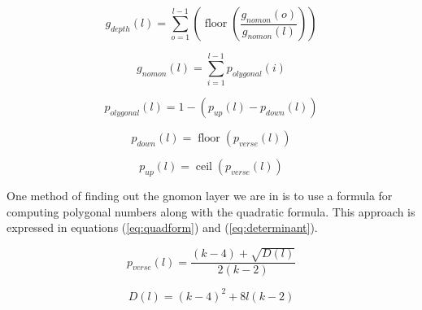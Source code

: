 \documentclass{article}
\begin{document}
\begin{equation}
    g_{depth}\left(l\right)=\sum_{o=1}^{l-1}\left(\operatorname{floor}\left(\frac{g_{nomon}\left(o\right)}{g_{nomon}\left(l\right)}\right)\right)
\end{equation}

\begin{equation}
    g_{nomon}\left(l\right)=\sum_{i=1}^{l-1}p_{olygonal}\left(i\right)
\end{equation}

\begin{equation}
    p_{olygonal}\left(l\right)=1-\left(p_{up}\left(l\right)-p_{down}\left(l\right)\right)
\end{equation}

\begin{equation}
p_{down}\left(l\right)=\operatorname{floor}\left(p_{verse}\left(l\right)\right)
\end{equation}

\begin{equation}
p_{up}\left(l\right)=\operatorname{ceil}\left(p_{verse}\left(l\right)\right)
\end{equation}

One method of finding out the gnomon layer we are in is to use a formula for computing polygonal numbers along with the quadratic formula. This approach is expressed in equations (\ref{eq:quadform}) and (\ref{eq:determinant}).

\begin{equation}
    p_{verse}\left(l\right)=\frac{\left(k-4\right)+\sqrt{D\left(l\right)}}{2\left(k-2\right)}
     \label{eq:quadform}
\end{equation}

\begin{equation}
    D\left(l\right)=\left(k-4\right)^{2}+8l\left(k-2\right)
    \label{eq:determinant}
\end{equation}
\end{document}
